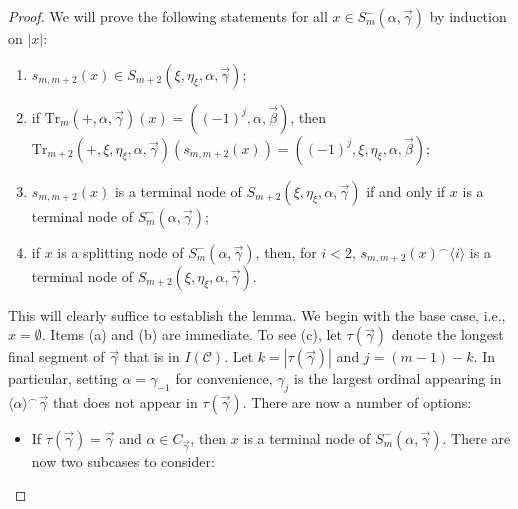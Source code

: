 \documentclass[10pt,a4paper]{amsart}
\newcommand{\acc}{\mathrm{acc}}
\newcommand{\mc}{\mathcal}
\newcommand{\nacc}{\mathrm{nacc}}
\begin{document}
\begin{proof}
  We will prove the following statements for all $x \in S^-_m(\alpha,\vec{\gamma})$ 
  by induction on $|x|$:
  \begin{enumerate}[label = (\alph*)]
    \item $s_{m,m+2}(x) \in S_{m+2}(\xi,\eta_\xi,\alpha,\vec{\gamma})$;
    \item if $\mathrm{Tr}_m(+,\alpha,\vec{\gamma})(x) = 
    ((-1)^j,\alpha,\vec{\beta})$, then 
    $\mathrm{Tr}_{m+2}(+,\xi,\eta_\xi,\alpha,\vec{\gamma})(s_{m,m+2}(x)) = 
    ((-1)^j,\xi,\eta_\xi,\alpha,\vec{\beta})$;
    \item $s_{m,m+2}(x)$ is a terminal node of $S_{m+2}(\xi,\eta_\xi,\alpha, 
    \vec{\gamma})$ if and only if $x$ is a terminal node of 
    $S^-_m(\alpha,\vec{\gamma})$;
    \item if $x$ is a splitting node of $S^-_m(\alpha,\vec{\gamma})$, then, for $i < 2$, 
    $s_{m,m+2}(x)^\smallfrown \langle i \rangle$ is a terminal node of 
    $S_{m+2}(\xi,\eta_\xi,\alpha,\vec{\gamma})$.
  \end{enumerate}
  This will clearly suffice to establish the lemma.
  We begin with the base case, i.e., $x = \emptyset$. Items (a) and (b) are 
  immediate. To see (c), let $\tau(\vec{\gamma})$ denote the longest final segment 
  of $\vec{\gamma}$ that is in $I(\mc{C})$. Let 
  $k = |\tau(\vec{\gamma})|$ and $j = (m-1)-k$. In particular, setting 
  $\alpha = \gamma_{-1}$ for convenience, $\gamma_j$ is the largest ordinal appearing 
  in $\langle \alpha \rangle^\smallfrown \vec{\gamma}$ that does not appear in 
  $\tau(\vec{\gamma})$. There are now a number of options:
  \begin{itemize}
    \item If $\tau(\vec{\gamma}) = \vec{\gamma}$ and $\alpha \in C_{\vec{\gamma}}$, 
    then $x$ is a terminal node of $S^-_m(\alpha,\vec{\gamma})$. There are now two 
    subcases to consider:
\end{itemize}
\end{proof}
\end{document}
